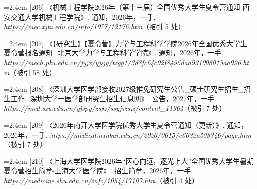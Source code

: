 {\vspace{3.5pt}\par
\nopagebreak\vspace{1pt}
\noindent\hangindent=2.4em \label{src:S0263}{\color{cAccent}[206]} 《机械工程学院2026年（第十三届）全国优秀大学生夏令营通知-西安交通大学机械工程学院》. 通知，2026年，一手. \textit{https://mec.xjtu.edu.cn/info/1057/12176.htm}（被引 5 处）\par
\vspace{0.6pt}
\vspace{3.5pt}\par
\nopagebreak\vspace{1pt}
\noindent\hangindent=2.4em \label{src:S0264}{\color{cAccent}[207]} 《【研究生】【夏令营】力学与工程科学学院2026年全国优秀大学生夏令营报名通知\_北京大学力学与工程科学学院》. 通知，2026年，一手. \textit{https://mech.pku.edu.cn/jyjx/yjsjy/tzgg1/3d8fc64c92f8495daa931008015aa996.htm}（被引 58 处）\par
\vspace{0.6pt}
\vspace{3.5pt}\par
\nopagebreak\vspace{1pt}
\noindent\hangindent=2.4em \label{src:S0265}{\color{cAccent}[208]} 《深圳大学医学部接收2027级推免研究生公告\_硕士研究生招生\_招生工作\_深圳大学一医学部研究生招生信息网》. 公告，2027年，一手. \textit{https://med.szu.edu.cn/yjspy/zsgz/ssyjszsjz/content\_11964}（被引 7 处）\par
\vspace{0.6pt}
\vspace{3.5pt}\par
\nopagebreak\vspace{1pt}
\noindent\hangindent=2.4em \label{src:S0266}{\color{cAccent}[209]} 《2026年南开大学医学院优秀大学生夏令营通知（更新）》. 通知，2026年，一手. \textit{https://medical.nankai.edu.cn/2026/0615/c6632a598346/page.htm}（被引 7 处）\par
\vspace{0.6pt}
\vspace{3.5pt}\par
\nopagebreak\vspace{1pt}
\noindent\hangindent=2.4em \label{src:S0268}{\color{cAccent}[210]} 《上海大学医学院2026年“医心向远，逐光上大”全国优秀大学生暑期夏令营招生简章-上海大学医学院》. 招生简章，2026年，一手. \textit{https://medicine.shu.edu.cn/info/1054/17107.htm}（被引 4 处）\par
}
